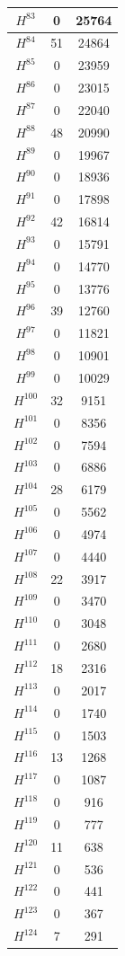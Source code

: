 \begin{tabular}{|c|c|c|}
\hline
$H^{83}$&0&25764\\\hline
$H^{84}$&51&24864\\\hline
$H^{85}$&0&23959\\\hline
$H^{86}$&0&23015\\\hline
$H^{87}$&0&22040\\\hline
$H^{88}$&48&20990\\\hline
$H^{89}$&0&19967\\\hline
$H^{90}$&0&18936\\\hline
$H^{91}$&0&17898\\\hline
$H^{92}$&42&16814\\\hline
$H^{93}$&0&15791\\\hline
$H^{94}$&0&14770\\\hline
$H^{95}$&0&13776\\\hline
$H^{96}$&39&12760\\\hline
$H^{97}$&0&11821\\\hline
$H^{98}$&0&10901\\\hline
$H^{99}$&0&10029\\\hline
$H^{100}$&32&9151\\\hline
$H^{101}$&0&8356\\\hline
$H^{102}$&0&7594\\\hline
$H^{103}$&0&6886\\\hline
$H^{104}$&28&6179\\\hline
$H^{105}$&0&5562\\\hline
$H^{106}$&0&4974\\\hline
$H^{107}$&0&4440\\\hline
$H^{108}$&22&3917\\\hline
$H^{109}$&0&3470\\\hline
$H^{110}$&0&3048\\\hline
$H^{111}$&0&2680\\\hline
$H^{112}$&18&2316\\\hline
$H^{113}$&0&2017\\\hline
$H^{114}$&0&1740\\\hline
$H^{115}$&0&1503\\\hline
$H^{116}$&13&1268\\\hline
$H^{117}$&0&1087\\\hline
$H^{118}$&0&916\\\hline
$H^{119}$&0&777\\\hline
$H^{120}$&11&638\\\hline
$H^{121}$&0&536\\\hline
$H^{122}$&0&441\\\hline
$H^{123}$&0&367\\\hline
$H^{124}$&7&291\\ \hline
\end{tabular}
